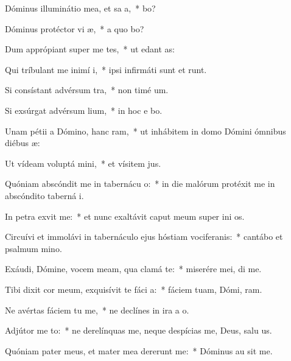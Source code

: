 \item Dóminus illuminátio mea, et sa a,~*  bo?
\item Dóminus protéctor vi æ,~* a quo bo?
\item Dum apprópiant super me tes,~* ut edant  as:
\item Qui tríbulant me inimí i,~* ipsi infirmáti sunt et runt.
\item Si consístant advérsum  tra,~* non timé  um.
\item Si exsúrgat advérsum  lium,~* in hoc e bo.
\item Unam pétii a Dómino, hanc ram,~* ut inhábitem in domo Dómini ómnibus diébus  æ:
\item Ut vídeam voluptá mini,~* et vísitem  jus.
\item Quóniam abscóndit me in tabernácu o:~* in die malórum protéxit me in abscóndito taberná i.
\item In petra exvit me:~* et nunc exaltávit caput meum super ini os.
\item Circuívi et immolávi in tabernáculo ejus hóstiam vociferanis:~* cantábo et psalmum  mino.
\item Exáudi, Dómine, vocem meam, qua clamá  te:~* miserére mei,  di me.
\item Tibi dixit cor meum, exquisívit te fáci a:~* fáciem tuam, Dómi, ram.
\item Ne avértas fáciem tu  me,~* ne declínes in ira a  o.
\item Adjútor me to:~* ne derelínquas me, neque despícias me, Deus, salu us.
\item Quóniam pater meus, et mater mea dererunt me:~* Dóminus au sit me.

